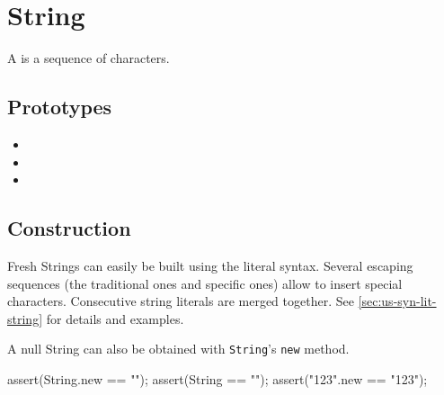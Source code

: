 \section{String}

A  is a sequence of characters.

\subsection{Prototypes}
\begin{itemize}
\item {}
\item {}
\item {}
\end{itemize}

\subsection{Construction}
Fresh Strings can easily be built using the literal syntax.  Several
escaping sequences (the traditional ones and \us specific ones) allow
to insert special characters.  Consecutive string literals are merged
together.  See \autoref{sec:us-syn-lit-string} for details and
examples.

A null String can also be obtained with \lstinline|String|'s
\lstinline|new| method.

\begin{urbiscript}
assert(String.new == "");
assert(String == "");
assert("123".new == "123");
\end{urbiscript}

